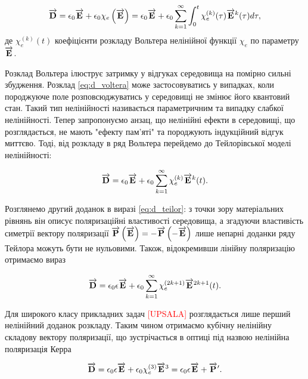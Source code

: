 \begin{equation} \label{eq:d_voltera}
\overrightarrow{\mathbf D} = \epsilon_0 \overrightarrow{\mathbf E} + \epsilon_0 \chi_e \left( \overrightarrow{\mathbf E} \right) = 
\epsilon_0 \overrightarrow{\mathbf E} + \epsilon_0 \sum_{k=1}^{\infty} \int_0^t
\chi_e^{(k)} (\tau) \overrightarrow{\mathbf E}^k (\tau) d \tau,
\end{equation}
%
де $\chi_e^{(k)} (t) $ коефіцієнти розкладу Вольтера нелінійної функції 
$ \chi_e $ по параметру $ \overrightarrow{\mathbf E} $.

Розклад Вольтера ілюструє затримку у відгуках середовища на помірно сильні 
збудження. Розклад \eqref{eq:d_voltera} може застосовуватись у випадках,
коли породжуюче поле розповсюджуватись у середовищі не змінює його квантовий
стан. Такий тип нелінійності називається параметричним та випадку слабкої 
нелінійності. Тепер запропонуємо анзац, що нелінійні ефекти в середовищі,
що розглядається, не мають "ефекту пам'яті" та породжують індукційний відгук 
миттєво. Тоді, від розкладу в ряд Вольтера перейдемо до Тейлорівської 
моделі нелінійності:

\begin{equation} \label{eq:d_teilor}
\overrightarrow{\mathbf D} = \epsilon_0 \overrightarrow{\mathbf E} + 
\epsilon_0 \sum_{k=1}^{\infty} \chi_e^{(k)} \overrightarrow{\mathbf E}^k (t).
\end{equation}

Розглянемо другий доданок в виразі \eqref{eq:d_teilor}: з точки зору 
матеріальних рівнянь він описує поляризаційні властивості середовища,
а згадуючи властивість симетрії вектору поляризації 
$ \overrightarrow{\mathbf P} \left( \overrightarrow{\mathbf E} \right) = - \overrightarrow{\mathbf P} \left( - \overrightarrow{\mathbf E} \right) $
лише непарні доданки ряду Тейлора можуть бути не нульовими. Також,
відокремивши лінійну поляризацію отримаємо вираз

\begin{equation} \label{eq:d_teilor_odd}
\overrightarrow{\mathbf D} = \epsilon_0 \epsilon \overrightarrow{\mathbf E} + 
\epsilon_0 \sum_{k=1}^{\infty} \chi_e^{(2k+1)} \overrightarrow{\mathbf E}^{2k+1} (t).
\end{equation}

Для широкого класу прикладних задач \textcolor{red}{[UPSALA]} розглядається
лише перший нелінійний доданок розкладу. Таким чином отримаємо кубічну 
нелінійну складову вектору поляризації, що зустрічається в оптиці під 
назвою нелінійна поляризація Керра

\begin{equation} \label{eq:d_kerr}
\overrightarrow{\mathbf D} = 
\epsilon_0 \epsilon \overrightarrow{\mathbf E} + \epsilon_0 \chi_e^{(3)} \overrightarrow{\mathbf E}^{3} = 
\epsilon_0 \epsilon \overrightarrow{\mathbf E} + \overrightarrow{\mathbf P}^\prime.
\end{equation}

